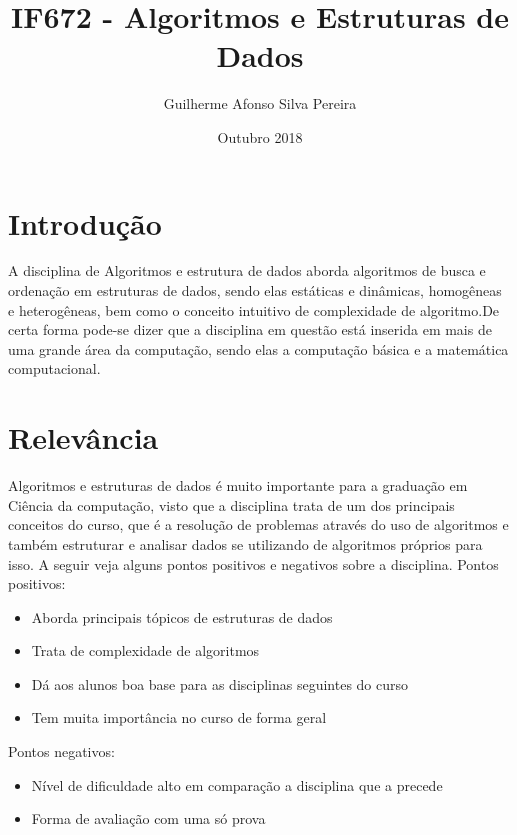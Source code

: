 \documentclass{article}
\title{IF672 - Algoritmos e Estruturas de Dados}
\author{Guilherme Afonso Silva Pereira}
\date{Outubro 2018}
\begin{document}
\maketitle

\section{Introdução}
A disciplina de Algoritmos e estrutura de dados aborda algoritmos de busca e ordenação em estruturas de dados, sendo elas estáticas e dinâmicas, homogêneas e heterogêneas, bem como o conceito intuitivo de complexidade de algoritmo\cite{sitedisciplina}\cite{sitedisciplina2}.De certa forma pode-se dizer que a disciplina em questão está inserida em mais de uma grande área da computação, sendo elas a computação básica e a matemática computacional\cite{sitesubareas}.

\section{Relevância}
Algoritmos e estruturas de dados é muito importante para a graduação em Ciência da computação, visto que a disciplina trata de um dos principais conceitos do curso, que é a resolução de problemas através do uso de algoritmos e também estruturar e analisar dados se utilizando de algoritmos próprios para isso. A seguir veja alguns pontos positivos e negativos sobre a disciplina.
\newline
\newline
Pontos positivos:
\begin{itemize}
   \item Aborda principais tópicos de estruturas de dados
   \item Trata de complexidade de algoritmos
   \item Dá aos alunos boa base para as disciplinas seguintes do curso
   \item Tem muita importância no curso de forma geral
 \end{itemize}
 \noindent
Pontos negativos:
\begin{itemize}
   \item Nível de dificuldade alto em comparação a disciplina que a precede
   \item Forma de avaliação com uma só prova
\end{itemize}
\vspace{1.2cm}
\end{document}
